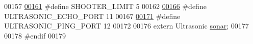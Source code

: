 \begin{DoxyCode}
00157 
\hypertarget{sensors_8h_source.tex_l00161}{}\hyperlink{sensors_8h_a354b5ed50c08708ba703ca9e9121a0cf}{00161} \textcolor{preprocessor}{#define SHOOTER\_LIMIT 5}
00162 
\hypertarget{sensors_8h_source.tex_l00166}{}\hyperlink{sensors_8h_ac6e827f0a9c2f52b4d935274daad778a}{00166} \textcolor{preprocessor}{#define ULTRASONIC\_ECHO\_PORT 11}
00167 
\hypertarget{sensors_8h_source.tex_l00171}{}\hyperlink{sensors_8h_a97be84893513dc7afb5c4c26b7bdd074}{00171} \textcolor{preprocessor}{#define ULTRASONIC\_PING\_PORT 12}
00172 
00176 \textcolor{keyword}{extern} Ultrasonic \hyperlink{sensors_8h_a09e334aba0637f228c65c135f428606a}{sonar};
00177 
00178 \textcolor{preprocessor}{#endif}
00179 
\end{DoxyCode}
